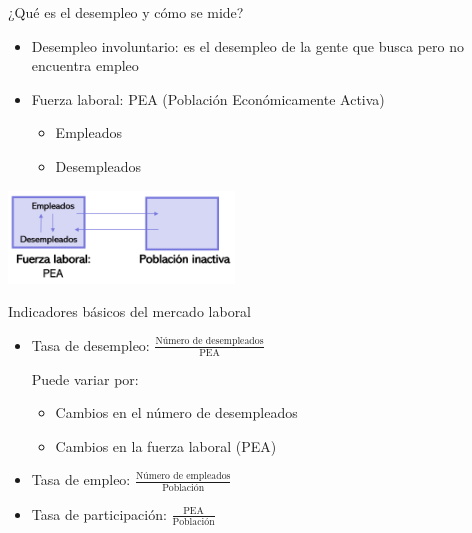\documentclass{beamer}
\newcommand\dangersignw[1][2ex]{%
  \scaleto{\stackengine{0.3pt}{\scalebox{1.1}[.9]{%
  \color{red}$\blacktriangle$}}{\color{white}\tiny\bfseries !}{O}{c}{F}{F}{L}}{#1}%
}
\begin{document}
\begin{frame}{¿Qué es el desempleo y cómo se mide?}
\begin{itemize}
    \item Desempleo involuntario: es el desempleo de la gente que busca pero no encuentra empleo
    \item Fuerza laboral: PEA (Población Económicamente Activa)
        \begin{itemize}
            \item Empleados
            \item Desempleados
        \end{itemize}
\end{itemize}
\vspace{3mm}
\centering\includegraphics[width=6cm]{Figures/P32.png}\
\end{frame}

\begin{frame}{Indicadores básicos del mercado laboral}
\begin{itemize}
    \item Tasa de desempleo: $\frac{\text {Número de desempleados}}{\text{PEA}}$
    \vspace{3mm}
    
        \dangersignw Puede variar por: 
        \begin{itemize}
            \vspace{2mm}
        \item Cambios en el número de desempleados
            \vspace{2mm}
        \item Cambios en la fuerza laboral (PEA)
        \end{itemize}
           \vspace{3mm}
    \item Tasa de empleo: $\frac{\text {Número de empleados}}{\text{Población}}$
    \vspace{3mm}
    \item Tasa de participación: $\frac{\text {PEA}}{\text{Población}}$
\end{itemize}
\end{frame}
\end{document}
